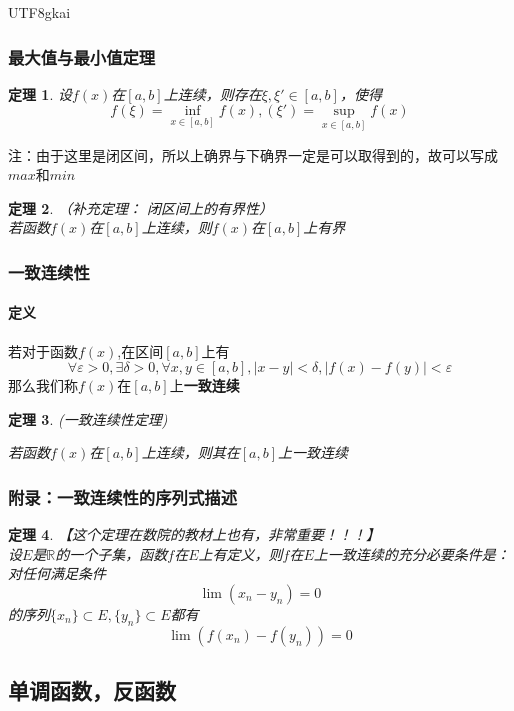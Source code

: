 \documentclass{article}
\newtheorem{theorem}{定理}[subsection]
\begin{document}
\begin{CJK}{UTF8}{gkai}
\subsubsection{最大值与最小值定理}
\begin{theorem}

设$f(x)$在$[a,b]$上连续，则存在$\xi ,\xi'\in[a,b]$，使得
\[f(\xi)=\inf_{x\in[a,b]}f(x),(\xi')=\sup_{x\in[a,b]}f(x)\]
\end{theorem}
注：由于这里是闭区间，所以上确界与下确界一定是可以取得到的，故可以写成$max$和$min$\\

\begin{theorem}（补充定理： 闭区间上的有界性）\\
若函数$f(x)$在$[a,b]$上连续，则$f(x)$在$[a,b]$上有界\\
\end{theorem}

\subsubsection{一致连续性}
\paragraph{定义\\}
若对于函数$f(x)$,在区间$[a,b]$上有
\[\forall \varepsilon>0,\exists \delta >0,\forall x,y\in[a,b],|x-y|<\delta,|f(x)-f(y)|<\varepsilon\]
那么我们称$f(x)$在$[a,b]$上\textbf{一致连续}\\
\begin{theorem}(一致连续性定理)

若函数$f(x)$在$[a,b]$上连续，则其在$[a,b]$上一致连续\\
\end{theorem}
\subsubsection*{附录：一致连续性的序列式描述}

\begin{theorem}

【这个定理在数院的教材上也有，非常重要！！！】\\
设$E$是$\mathbb{R}$的一个子集，函数$f$在$E$上有定义，则$f$在$E$上一致连续的充分必要条件是：对任何满足条件
\[\lim(x_n-y_n)=0\]
的序列$\{x_n\}\subset E,\{y_n\}\subset E$都有
\[\lim(f(x_n)-f(y_n))=0\]
\end{theorem}

\subsection{单调函数，反函数}


\end{CJK}
\end{document}
